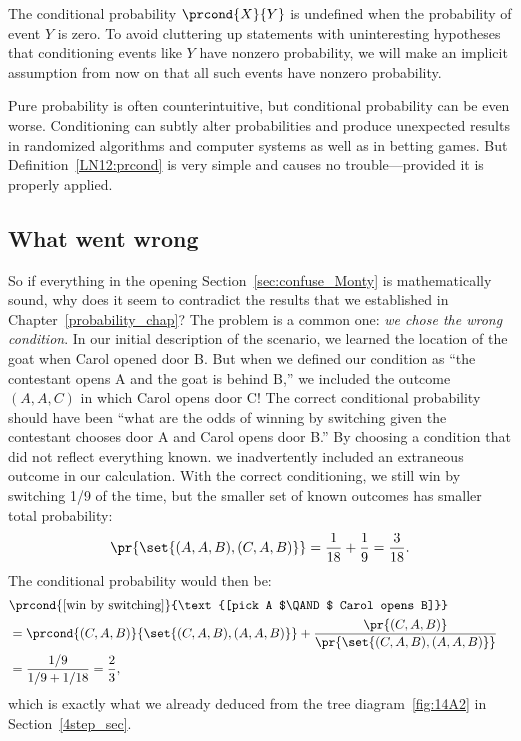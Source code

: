 The conditional probability $\prcond{X}{Y}$ is undefined when the
probability of event $Y$ is zero.  To avoid cluttering up statements
with uninteresting hypotheses that conditioning events like $Y$ have
nonzero probability, we will make an implicit assumption from now on
that all such events have nonzero probability.

Pure probability is often counterintuitive, but conditional
probability can be even worse.  Conditioning can subtly alter
probabilities and produce unexpected results in randomized algorithms
and computer systems as well as in betting games.  But Definition~\ref{LN12:prcond} is
very simple and causes no trouble---provided it is properly applied.

\subsection{What went wrong}

So if everything in the opening Section~\ref{sec:confuse_Monty} is
mathematically sound, why does it seem to contradict the results that
we established in Chapter~\ref{probability_chap}?  The problem is a
common one: \emph{we chose the wrong condition}.  In our initial
description of the scenario, we learned the location of the goat when
Carol opened door B.  But when we defined our condition as ``the
contestant opens A and the goat is behind B,'' we included the outcome
$(A, A, C)$ in which Carol opens door C!  The correct conditional
probability should have been ``what are the odds of winning by
switching given the contestant chooses door A and Carol opens door
B.''  By choosing a condition that did not reflect everything known.
we inadvertently included an extraneous outcome in our calculation.
With the correct conditioning, we still win by switching 1/9 of the
time, but the smaller set of known outcomes has smaller total
probability:
\[
\pr{\set{(A, A, B),(C, A, B)}} = \frac{1}{18} + \frac{1}{9} = \frac{3}{18}.
\]
The conditional probability would then be:
\begin{align*}
\lefteqn{\prcond{\text{[win by switching]}}{\text{[pick A $\QAND$ Carol opens B]}}}\\
 & = \prcond{(C, A, B)}{\set{(C, A, B),(A, A, B)}}
          + \frac{\pr{(C, A, B)}}{\pr{\set{(C, A, B),(A, A, B)}}}\\
 & = \frac{1/9}{1/9 + 1/18} =  \frac{2}{3},
\end{align*}
which is exactly what we already deduced from the tree
diagram~\ref{fig:14A2} in Section~\ref{4step_sec}.

